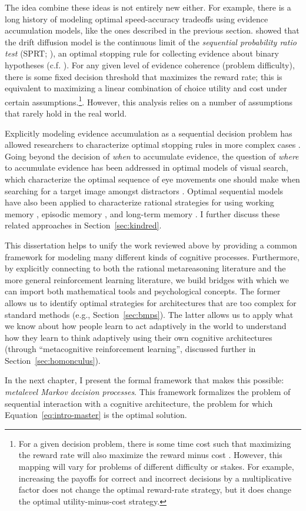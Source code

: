 The idea combine these ideas is not entirely new either. For example, there is a long history of modeling optimal speed-accuracy tradeoffs using evidence accumulation models, like the ones described in the previous section. \citet{bogacz2006physics} showed that the drift diffusion model is the continuous limit of the \emph{sequential probability ratio test} (SPRT; \citealp{wald1945sequential}), an optimal stopping rule for collecting evidence about binary hypotheses (c.f. \citealp{gold2002banburismus}). For any given level of evidence coherence (problem difficulty), there is some fixed decision threshold that maximizes the reward rate; this is equivalent to maximizing a linear combination of choice utility and cost under certain assumptions.\footnote{
  For a given decision problem, there is some time cost such that maximizing the reward rate will also maximize the reward minus cost \citep{wald1948optimum,drugowitsch2012cost}. However, this mapping will vary for problems of different difficulty or stakes. For example, increasing the payoffs for correct and incorrect decisions by a multiplicative factor does not change the optimal reward-rate strategy, but it does change the optimal utility-minus-cost strategy.
}. However, this analysis relies on a number of assumptions that rarely hold in the real world.

Explicitly modeling evidence accumulation as a sequential decision problem has allowed researchers to characterize optimal stopping rules in more complex cases \citep{drugowitsch2012cost,fudenberg2018speed,tajima2019optimal}. Going beyond the decision of \emph{when} to accumulate evidence, the question of \emph{where} to accumulate evidence has been addressed in optimal models of visual search, which characterize the optimal sequence of eye movements one should make when searching for a target image amongst distractors \citep{butko2008ipomdp,acharya2017human,hoppe2019multistep}. Optimal sequential models have also been applied to characterize rational strategies for using working memory \citep{oreilly2006making,todd2008learning,suchow2016deciding}, episodic memory \citep{lu2022neural}, and long-term memory \citep{zhang2022optimal}. I further discuss these related approaches in Section~\ref{sec:kindred}.

This dissertation helps to unify the work reviewed above by providing a common framework for modeling many different kinds of cognitive processes. Furthermore, by explicitly connecting to both the rational metareasoning literature and the more general reinforcement learning literature, we build bridges with which we can import both mathematical tools and psychological concepts. The former allows us to identify optimal strategies for architectures that are too complex for standard methods (e.g., Section~\ref{sec:bmps}). The latter allows us to apply what we know about how people learn to act adaptively in the world to understand how they learn to think adaptively using their own cognitive architectures (through ``metacognitive reinforcement learning'', discussed further in Section~\ref{sec:homonculus}).

In the next chapter, I present the formal framework that makes this possible:  \emph{metalevel Markov decision processes}. This framework formalizes the problem of sequential interaction with a cognitive architecture, the problem for which Equation~\ref{eq:intro-master} is the optimal solution.
